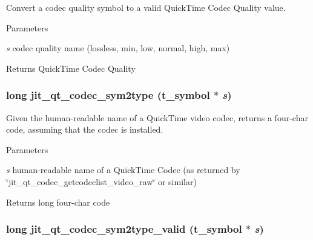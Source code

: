 Convert a codec quality symbol to a valid QuickTime Codec Quality value. 
\begin{DoxyParams}{Parameters}
\item[{\em s}]codec quality name (lossless, min, low, normal, high, max)\end{DoxyParams}
\begin{DoxyReturn}{Returns}
QuickTime Codec Quality 
\end{DoxyReturn}
\hypertarget{group__qtcodecmod_ga7e31fb1b430d6166e865dd82f9c7ce85}{
\subsubsection[{jit\_\-qt\_\-codec\_\-sym2type}]{\setlength{\rightskip}{0pt plus 5cm}long jit\_\-qt\_\-codec\_\-sym2type ({\bf t\_\-symbol} $\ast$ {\em s})}}
\label{group__qtcodecmod_ga7e31fb1b430d6166e865dd82f9c7ce85}


Given the human-\/readable name of a QuickTime video codec, returns a four-\/char code, assuming that the codec is installed. 
\begin{DoxyParams}{Parameters}
\item[{\em s}]human-\/readable name of a QuickTime Codec (as returned by \char`\"{}jit\_\-qt\_\-codec\_\-getcodeclist\_\-video\_\-raw\char`\"{} or similar)\end{DoxyParams}
\begin{DoxyReturn}{Returns}
long four-\/char code 
\end{DoxyReturn}
\hypertarget{group__qtcodecmod_gad3c44980ff81d6d6473d86323597c0b5}{
\subsubsection[{jit\_\-qt\_\-codec\_\-sym2type\_\-valid}]{\setlength{\rightskip}{0pt plus 5cm}long jit\_\-qt\_\-codec\_\-sym2type\_\-valid ({\bf t\_\-symbol} $\ast$ {\em s})}}
\label{group__qtcodecmod_gad3c44980ff81d6d6473d86323597c0b5}


